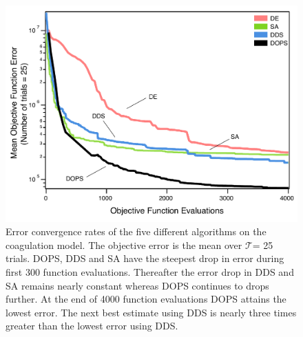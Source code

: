 \documentclass[12pt]{article}
\begin{document}
\begin{figure}[h]
\centering
\includegraphics[width=1.0\textwidth]{./figs/Figure_4_Errors_convergence_v2.pdf}
\caption{Error convergence rates of the five different algorithms on the coagulation model. The objective error is the mean over $\mathcal{T}$= 25 trials.
DOPS, DDS and SA have the steepest drop in error during first 300 function evaluations. Thereafter the error drop in DDS and SA remains nearly constant whereas DOPS continues to drops further.
At the end of 4000 function evaluations DOPS attains the lowest error. The next best estimate using DDS is nearly three times greater than the lowest error using DDS.
}\label{fig-convergence}
\end{figure}

\clearpage
\end{document}
